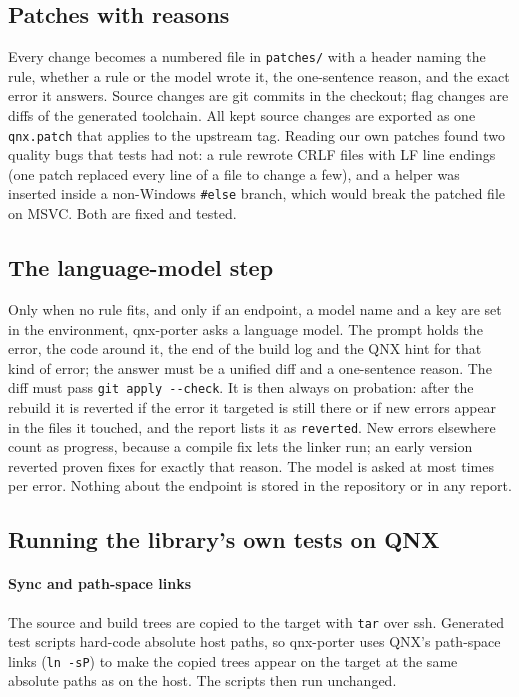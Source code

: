 \documentclass[conference]{IEEEtran}
\begin{document}
\subsection{Patches with reasons}\label{sec:patches}
Every change becomes a numbered file in \texttt{patches/} with a header naming the rule, whether a rule or the
model wrote it, the one-sentence reason, and the exact error it answers. Source changes are git commits in the
checkout; flag changes are diffs of the generated toolchain. All kept source changes are exported as one
\texttt{qnx.patch} that applies to the upstream tag. Reading our own patches found two quality bugs that tests had
not: a rule rewrote CRLF files with LF line endings (one patch replaced every line of a file to change a few), and
a helper was inserted inside a non-Windows \texttt{\#else} branch, which would break the patched file on MSVC.
Both are fixed and tested.

\subsection{The language-model step}\label{sec:model}
Only when no rule fits, and only if an endpoint, a model name and a key are set in the environment, qnx-porter
asks a language model. The prompt holds the error, the code around it, the end of the build log and the QNX hint
for that kind of error; the answer must be a unified diff and a one-sentence reason. The diff must pass
\texttt{git apply -{}-check}. It is then always on probation: after the rebuild it is reverted if the error it
targeted is still there or if new errors appear in the files it touched, and the report lists it as
\texttt{reverted}. New errors elsewhere count as progress, because a compile fix lets the linker run; an early
version reverted proven fixes for exactly that reason. The model is asked at most  times per
error. Nothing about the endpoint is stored in the repository or in any report.

\subsection{Running the library's own tests on QNX}\label{sec:tests}
\paragraph{Sync and path-space links} The source and build trees are copied to the target with \texttt{tar}
over ssh. Generated test scripts hard-code absolute host paths, so qnx-porter uses QNX's path-space links
(\texttt{ln -sP}) to make the copied trees appear on the target at the same absolute paths as on the host. The
scripts then run unchanged.
\end{document}
